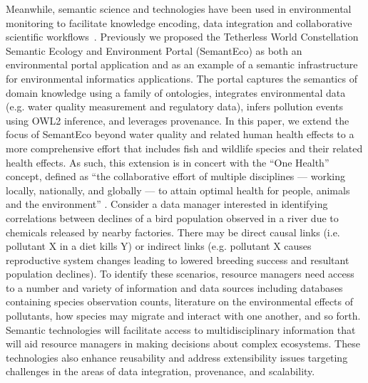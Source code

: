 \documentclass[letterpaper]{report}
\begin{document}
Meanwhile, semantic science and technologies have been used in environmental monitoring to facilitate knowledge encoding, data integration and collaborative scientific workflows~\cite{environmental-modelling}. Previously we proposed the Tetherless World Constellation Semantic Ecology and Environment Portal (SemantEco) \cite{SemantAqua:ISWC2011,SemantAqua:Wang-MSThesis} as both an environmental portal application and as an example of a semantic infrastructure for environmental informatics applications. The portal captures the semantics of domain knowledge using a family of ontologies, integrates environmental data (e.g. water quality measurement and regulatory data), infers pollution events using OWL2 inference, and leverages provenance. In this paper, we extend the focus of SemantEco beyond water quality and related human health effects to a more comprehensive effort that includes fish and wildlife species and their related health effects. As such, this extension is in concert with the “One Health” concept, defined as ``the collaborative effort of multiple disciplines — working locally, nationally, and globally — to attain optimal health for people, animals and the environment'' \cite{one-health}. Consider a data manager interested in identifying correlations between declines of a bird population observed in a river due to chemicals released by nearby factories. There may be direct causal links (i.e. pollutant X in a diet kills Y) or indirect links (e.g. pollutant X causes reproductive system changes leading to lowered breeding success and resultant population declines). To identify these scenarios, resource managers need access to a number and variety of information and data sources including databases containing species observation counts, literature on the environmental effects of pollutants, how species may migrate and interact with one another, and so forth. Semantic technologies will facilitate access to multidisciplinary information that will aid resource managers in making decisions about complex ecosystems. These technologies also enhance reusability and address extensibility issues targeting challenges in the areas of data integration, provenance, and scalability.
\end{document}

